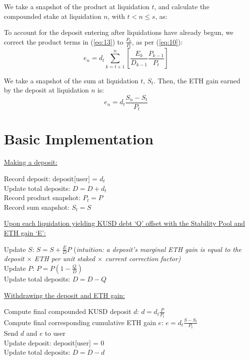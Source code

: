 \documentclass[reqno]{article}
\begin{document}
We take a snapshot of the product at liquidation $t$, and calculate the compounded stake at liquidation $n$, with $t < n \leq s$, as:

\bigskip
To account for the deposit entering after liquidations have already begun, we correct the product terms in (\ref{eq:13}) to $\frac{P_n}{P_t}$, as per (\ref{eq:10}):
\begin{equation} 
    e_n = d_t\sum^n_{k=t+1}\left[\frac{E_k}{D_{k-1}}\frac{P_{k-1}}{P_t}\right]
\end{equation}

\bigskip
We take a snapshot of the sum at liquidation $t$, $S_t$. Then, the ETH gain earned by the deposit at liquidation $n$ is:
\begin{equation} 
e_n=d_t\frac{S_n-S_t}{P_t}
\end{equation}

\bigskip
\section{Basic Implementation}
\underline{Making a deposit:}

Record deposit: deposit[user] = $d_t$\\
Update total deposits: $D = D + d_t$\\
Record product snapshot: $P_t = P$\\
Record sum snapshot: $S_t = S$

\bigskip
\underline{Upon each liquidation yielding KUSD debt ‘Q’ offset with the Stability Pool and ETH gain ‘E’:}

Update $S$: $S = S + \frac{E}{D}P$ (\textit{intuition: a deposit’s marginal ETH gain is equal to the deposit $\times$ ETH per unit staked $\times$ current correction factor)}\\
Update $P$: $P = P(1 - \frac{Q}{D})$\\
Update total deposits: $D = D - Q$

\bigskip
\underline{Withdrawing the deposit and ETH gain:}

Compute final compounded KUSD deposit $d$: $d = d_t\frac{P}{P_t}$\\
Compute final corresponding cumulative ETH gain $e$: $e = d_t\frac{S - S_t}{P_t}$\\
Send $d$ and $e$ to user\\
Update deposit: deposit[user] = 0\\
Update total deposits: $D = D - d$\\

\bigskip
\end{document}
